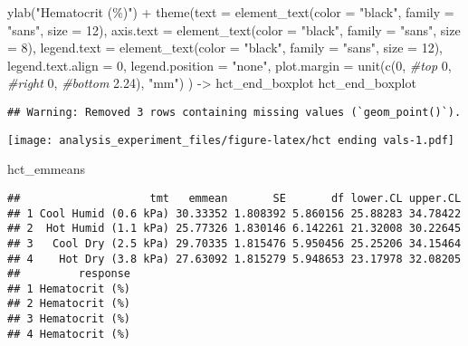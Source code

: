 \documentclass[
]{article}
\newenvironment{Shaded}{\begin{snugshade}}{\end{snugshade}}
\newcommand{\AttributeTok}[1]{\textcolor[rgb]{0.77,0.63,0.00}{#1}}
\newcommand{\CommentTok}[1]{\textcolor[rgb]{0.56,0.35,0.01}{\textit{#1}}}
\newcommand{\DecValTok}[1]{\textcolor[rgb]{0.00,0.00,0.81}{#1}}
\newcommand{\FloatTok}[1]{\textcolor[rgb]{0.00,0.00,0.81}{#1}}
\newcommand{\FunctionTok}[1]{\textcolor[rgb]{0.00,0.00,0.00}{#1}}
\newcommand{\NormalTok}[1]{#1}
\newcommand{\OtherTok}[1]{\textcolor[rgb]{0.56,0.35,0.01}{#1}}
\newcommand{\SpecialCharTok}[1]{\textcolor[rgb]{0.00,0.00,0.00}{#1}}
\newcommand{\StringTok}[1]{\textcolor[rgb]{0.31,0.60,0.02}{#1}}
\begin{document}
\begin{Shaded}
\begin{Highlighting}[]
  \FunctionTok{ylab}\NormalTok{(}\StringTok{"Hematocrit (\%)"}\NormalTok{) }\SpecialCharTok{+} 
  \FunctionTok{theme}\NormalTok{(}\AttributeTok{text =} \FunctionTok{element\_text}\NormalTok{(}\AttributeTok{color =} \StringTok{"black"}\NormalTok{, }
                            \AttributeTok{family =} \StringTok{"sans"}\NormalTok{, }
                            \AttributeTok{size =} \DecValTok{12}\NormalTok{),}
        \AttributeTok{axis.text =} \FunctionTok{element\_text}\NormalTok{(}\AttributeTok{color =} \StringTok{"black"}\NormalTok{, }
                                 \AttributeTok{family =} \StringTok{"sans"}\NormalTok{, }
                                 \AttributeTok{size =} \DecValTok{8}\NormalTok{),}
        \AttributeTok{legend.text =} \FunctionTok{element\_text}\NormalTok{(}\AttributeTok{color =} \StringTok{"black"}\NormalTok{, }
                                 \AttributeTok{family =} \StringTok{"sans"}\NormalTok{, }
                                 \AttributeTok{size =} \DecValTok{12}\NormalTok{),}
        \AttributeTok{legend.text.align =} \DecValTok{0}\NormalTok{,}
        \AttributeTok{legend.position =} \StringTok{"none"}\NormalTok{,}
        \AttributeTok{plot.margin =} \FunctionTok{unit}\NormalTok{(}\FunctionTok{c}\NormalTok{(}\DecValTok{0}\NormalTok{, }\CommentTok{\#top}
                              \DecValTok{0}\NormalTok{, }\CommentTok{\#right}
                              \DecValTok{0}\NormalTok{, }\CommentTok{\#bottom}
                              \FloatTok{2.24}\NormalTok{), }\StringTok{"mm"}\NormalTok{)}
\NormalTok{        ) }\OtherTok{{-}\textgreater{}}\NormalTok{ hct\_end\_boxplot}
\NormalTok{hct\_end\_boxplot}
\end{Highlighting}
\end{Shaded}

\begin{verbatim}
## Warning: Removed 3 rows containing missing values (`geom_point()`).
\end{verbatim}

\texttt{[image: analysis\_experiment\_files/figure-latex/hct ending vals-1.pdf]}

\begin{Shaded}
\begin{Highlighting}[]
\NormalTok{hct\_emmeans}
\end{Highlighting}
\end{Shaded}

\begin{verbatim}
##                    tmt   emmean       SE       df lower.CL upper.CL
## 1 Cool Humid (0.6 kPa) 30.33352 1.808392 5.860156 25.88283 34.78422
## 2  Hot Humid (1.1 kPa) 25.77326 1.830146 6.142261 21.32008 30.22645
## 3   Cool Dry (2.5 kPa) 29.70335 1.815476 5.950456 25.25206 34.15464
## 4    Hot Dry (3.8 kPa) 27.63092 1.815279 5.948653 23.17978 32.08205
##         response
## 1 Hematocrit (%)
## 2 Hematocrit (%)
## 3 Hematocrit (%)
## 4 Hematocrit (%)
\end{verbatim}
\end{document}

